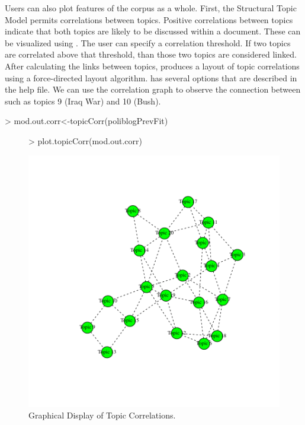 \documentclass[nojss]{jss}
\begin{document}
Users can also plot features of the corpus as a whole. First, the Structural Topic Model permits correlations between topics. Positive correlations between topics indicate that both topics are likely to be discussed within a document. These can be visualized using . The user can specify a correlation threshold.  If two topics are correlated above that threshold, than those two topics are considered linked.  After calculating the links between topics,  produces a layout of topic correlations using a force-directed layout algorithm.  has several options that are described in the help file. We can use the correlation graph to observe the connection between such as topics 9 (Iraq War) and 10 (Bush).

\begin{Schunk}
\begin{Sinput}
> mod.out.corr<-topicCorr(poliblogPrevFit)
\end{Sinput}
\end{Schunk}

\begin{figure}[t!]
\begin{center}
\begin{Schunk}
\begin{Sinput}
> plot.topicCorr(mod.out.corr)
\end{Sinput}
\end{Schunk}
\includegraphics{stmVignette-025}
\caption{Graphical Display of Topic Correlations.}
\label{fig:correlations}
\end{center}
\end{figure}
\end{document}
